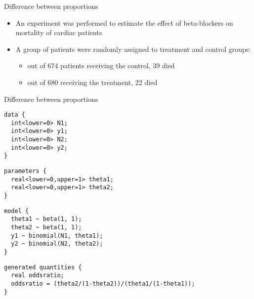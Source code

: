 \documentclass[finnish,english,t]{beamer}
\begin{document}
\begin{frame}{Difference between proportions}
  
\begin{itemize}
  \item An experiment was performed to estimate the effect of
    beta-blockers on mortality of cardiac patients
  \item A group of
    patients were randomly assigned to treatment and control groups:
    \begin{itemize}
    \item out of 674 patients receiving the control, 39 died
    \item out of 680 receiving the treatment, 22 died
    \end{itemize}
  \end{itemize}
\end{frame}

\begin{frame}[fragile]{Difference between proportions}

  
  \vspace{-0.5\baselineskip}
  {\small
    {
\begin{verbatim}
data {
  int<lower=0> N1;
  int<lower=0> y1;
  int<lower=0> N2;
  int<lower=0> y2;
}
\end{verbatim}
    }
    \vspace{-1.5\baselineskip}
    {
\begin{verbatim}
parameters {
  real<lower=0,upper=1> theta1;
  real<lower=0,upper=1> theta2;
}
\end{verbatim}
    }
    \vspace{-1.5\baselineskip}
    {
\begin{verbatim}
model {
  theta1 ~ beta(1, 1);
  theta2 ~ beta(1, 1);
  y1 ~ binomial(N1, theta1);
  y2 ~ binomial(N2, theta2);
}
\end{verbatim}
    }
    \vspace{-1.5\baselineskip}
    {
\begin{verbatim}
generated quantities {
  real oddsratio;
  oddsratio = (theta2/(1-theta2))/(theta1/(1-theta1));
}
\end{verbatim}
    }
  }
\end{frame}
\end{document}
